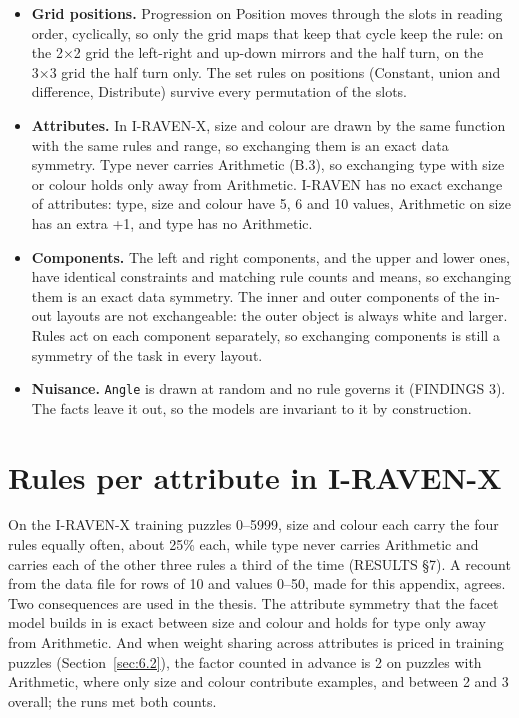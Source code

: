 \begin{itemize}
\item \textbf{Grid positions.} Progression on Position moves through the slots in reading order, cyclically, so only the grid maps that keep that cycle keep the rule: on the 2×2 grid the left-right and up-down mirrors and the half turn, on the 3×3 grid the half turn only. The set rules on positions (Constant, union and difference, Distribute) survive every permutation of the slots.
\item \textbf{Attributes.} In I-RAVEN-X, size and colour are drawn by the same function with the same rules and range, so exchanging them is an exact data symmetry. Type never carries Arithmetic (B.3), so exchanging type with size or colour holds only away from Arithmetic. I-RAVEN has no exact exchange of attributes: type, size and colour have 5, 6 and 10 values, Arithmetic on size has an extra +1, and type has no Arithmetic.
\item \textbf{Components.} The left and right components, and the upper and lower ones, have identical constraints and matching rule counts and means, so exchanging them is an exact data symmetry. The inner and outer components of the in-out layouts are not exchangeable: the outer object is always white and larger. Rules act on each component separately, so exchanging components is still a symmetry of the task in every layout.
\item \textbf{Nuisance.} \texttt{Angle} is drawn at random and no rule governs it (FINDINGS 3). The facts leave it out, so the models are invariant to it by construction.
\end{itemize}

\section{Rules per attribute in I-RAVEN-X}\label{sec:B.3}

On the I-RAVEN-X training puzzles 0–5999, size and colour each carry the four rules equally often, about 25\% each, while type never carries Arithmetic and carries each of the other three rules a third of the time (RESULTS \S{}7). A recount from the data file for rows of 10 and values 0–50, made for this appendix, agrees. Two consequences are used in the thesis. The attribute symmetry that the facet model builds in is exact between size and colour and holds for type only away from Arithmetic. And when weight sharing across attributes is priced in training puzzles (Section~\ref{sec:6.2}), the factor counted in advance is 2 on puzzles with Arithmetic, where only size and colour contribute examples, and between 2 and 3 overall; the runs met both counts.


